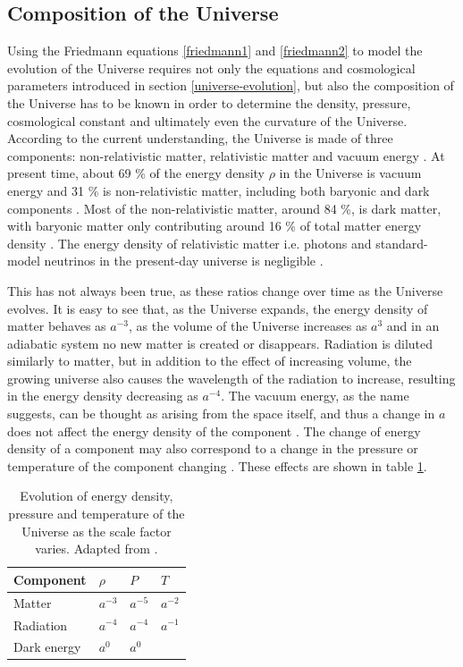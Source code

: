 \documentclass[english, oneside]{HYgradu}
\begin{document}
\subsection{Composition of the Universe} \label{universe-composition}
Using the Friedmann equations \ref{friedmann1} and \ref{friedmann2} to model the evolution of the Universe requires not only the equations and cosmological parameters introduced in section \ref{universe-evolution}, but also the composition of the Universe has to be known in order to determine the density, pressure, cosmological constant and ultimately even the curvature of the Universe. According to the current understanding, the Universe is made of three components: non-relativistic matter, relativistic matter and vacuum energy \citep{mo2010galaxy}. At present time, about 69 \% of the energy density $\rho$ in the Universe is vacuum energy and 31 \% is non-relativistic matter, including both baryonic and dark components \citep{planck2016resultsI}. Most of the non-relativistic matter, around 84 \%, is dark matter, with baryonic matter only contributing around 16 \% of total matter energy density \citep{planck2016resultsI}. The energy density of relativistic matter i.e. photons and standard-model neutrinos in the present-day universe is negligible \citep{mo2010galaxy}.

This has not always been true, as these ratios change over time as the Universe evolves. It is easy to see that, as the Universe expands, the energy density of matter behaves as $a^{-3}$, as the volume of the Universe increases as $a^3$ and in an adiabatic system no new matter is created or disappears. Radiation is diluted similarly to matter, but in addition to the effect of increasing volume, the growing universe also causes the wavelength of the radiation to increase, resulting in the energy density decreasing as $a^{-4}$. The vacuum energy, as the name suggests, can be thought as arising from the space itself, and thus a change in $a$ does not affect the energy density of the component \citep{mo2010galaxy}. The change of energy density of a component may also correspond to a change in the pressure or temperature of the component changing \citep{mo2010galaxy}. These effects are shown in table \ref{tab:thermodynamics}.

\begin{table}
	\centering
	\begin{tabular}{ l | l  l  l }
		Component & $\rho$ & $P$ & $T$ \\ \hline
		Matter & $a^{-3}$ & $a^{-5}$ & $a^{-2}$ \\
		Radiation & $a^{-4}$ & $a^{-4}$ & $a^{-1}$  \\
		Dark energy & $a^{0}$ & $a^{0}$  \\
	\end{tabular}
	\caption{Evolution of energy density, pressure and temperature of the Universe as the scale factor varies. Adapted from \citet{mo2010galaxy}.} \label{tab:thermodynamics}
\end{table}
\end{document}
